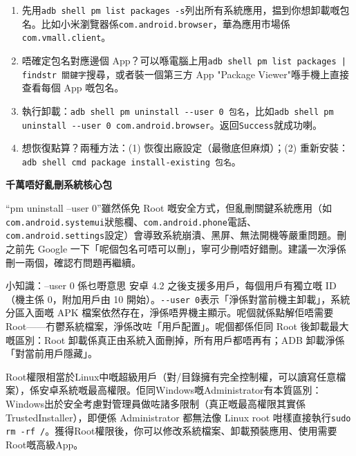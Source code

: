 \begin{enumerate}
  \item 先用\texttt{adb shell pm list packages -\allowbreak s}列出所有系統應用，揾到你想卸載嘅包名。比如小米瀏覽器係\texttt{com.\allowbreak android.\allowbreak browser}，華為應用市場係\texttt{com.\allowbreak vmall.\allowbreak client}。
  \item 唔確定包名對應邊個 App？可以喺電腦上用\texttt{adb shell pm list packages | findstr 關鍵字}搜尋，或者裝一個第三方 App "Package Viewer"喺手機上直接查看每個 App 嘅包名。
  \item 執行卸載：\texttt{adb shell pm uninstall -\allowbreak -\allowbreak user 0 包名}，比如\texttt{adb shell pm uninstall -\allowbreak -\allowbreak user 0 com.\allowbreak android.\allowbreak browser}。返回\texttt{Success}就成功喇。
  \item 想恢復點算？兩種方法：(1) 恢復出廠設定（最徹底但麻煩）；(2) 重新安裝：\texttt{adb shell cmd package install-\allowbreak existing 包名}。
\end{enumerate}

\textbf{千萬唔好亂刪系統核心包}\par

“pm uninstall --user 0”雖然係免 Root 嘅安全方式，但亂刪關鍵系統應用（如\texttt{com.\allowbreak android.\allowbreak systemui}狀態欄、\texttt{com.\allowbreak android.\allowbreak phone}電話、\texttt{com.\allowbreak android.\allowbreak settings}設定）會導致系統崩潰、黑屏、無法開機等嚴重問題。刪之前先 Google 一下「呢個包名可唔可以刪」，寧可少刪唔好錯刪。建議一次淨係刪一兩個，確認冇問題再繼續。

\begin{tcbinfo}{小知識：--user 0 係乜嘢意思}
安卓 4.2 之後支援多用戶，每個用戶有獨立嘅 ID（機主係 0，附加用戶由 10 開始）。\texttt{-\allowbreak -\allowbreak user 0}表示「淨係對當前機主卸載」，系統分區入面嘅 APK 檔案依然存在，淨係唔畀機主顯示。呢個就係點解佢唔需要 Root——冇鬱系統檔案，淨係改咗「用戶配置」。呢個都係佢同 Root 後卸載最大嘅區別：Root 卸載係真正由系統入面刪掉，所有用戶都唔再有；ADB 卸載淨係「對當前用戶隱藏」。

\end{tcbinfo}


Root權限相當於Linux中嘅超級用戶（對/目錄擁有完全控制權，可以讀寫任意檔案），係安卓系統嘅最高權限。佢同Windows嘅Administrator有本質區別：Windows出於安全考慮對管理員做咗諸多限制（真正嘅最高權限其實係 TrustedInstaller），即便係 Administrator 都無法像 Linux root 咁樣直接執行\texttt{sudo rm -\allowbreak rf /\allowbreak *}。獲得Root權限後，你可以修改系統檔案、卸載預裝應用、使用需要Root嘅高級App。

